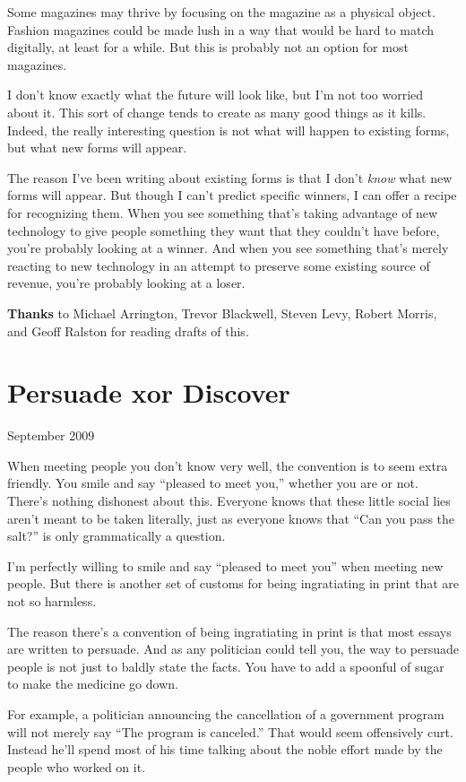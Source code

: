 \documentclass[12pt]{book}
\begin{document}
Some magazines may thrive by focusing on the magazine as a physical
object. Fashion magazines could be made lush in a way that would be hard
to match digitally, at least for a while. But this is probably not an
option for most magazines.

I don't know exactly what the future will look like, but I'm not too
worried about it. This sort of change tends to create as many good
things as it kills. Indeed, the really interesting question is not what
will happen to existing forms, but what new forms will appear.

The reason I've been writing about existing forms is that I don't
\emph{know} what new forms will appear. But though I can't predict
specific winners, I can offer a recipe for recognizing them. When you
see something that's taking advantage of new technology to give people
something they want that they couldn't have before, you're probably
looking at a winner. And when you see something that's merely reacting
to new technology in an attempt to preserve some existing source of
revenue, you're probably looking at a loser.


\textbf{Thanks} to Michael Arrington, Trevor Blackwell, Steven Levy,
Robert Morris, and Geoff Ralston for reading drafts of this.
\chapter{Persuade xor Discover }

September 2009

When meeting people you don't know very well, the convention is to seem
extra friendly. You smile and say ``pleased to meet you,'' whether you
are or not. There's nothing dishonest about this. Everyone knows that
these little social lies aren't meant to be taken literally, just as
everyone knows that ``Can you pass the salt?'' is only grammatically a
question.

I'm perfectly willing to smile and say ``pleased to meet you'' when
meeting new people. But there is another set of customs for being
ingratiating in print that are not so harmless.

The reason there's a convention of being ingratiating in print is that
most essays are written to persuade. And as any politician could tell
you, the way to persuade people is not just to baldly state the facts.
You have to add a spoonful of sugar to make the medicine go down.

For example, a politician announcing the cancellation of a government
program will not merely say ``The program is canceled.'' That would seem
offensively curt. Instead he'll spend most of his time talking about the
noble effort made by the people who worked on it.
\end{document}

